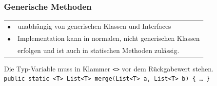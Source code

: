 {    \subsubsection{Generische Methoden}
        \begin{tabular}{l l}
            $\bullet$ & unabhängig von generischen Klassen und Interfaces\\
            $\bullet$ & Implementation kann in normalen, nicht generischen Klassen\\
                    & erfolgen und ist auch in statischen Methoden zulässig.\\
        \end{tabular}

        Die Typ-Variable muss in Klammer \verb|<>| vor dem Rückgabewert stehen. \\
        \verb|public static <T> List<T> merge(List<T> a, List<T> b) { … }|

}